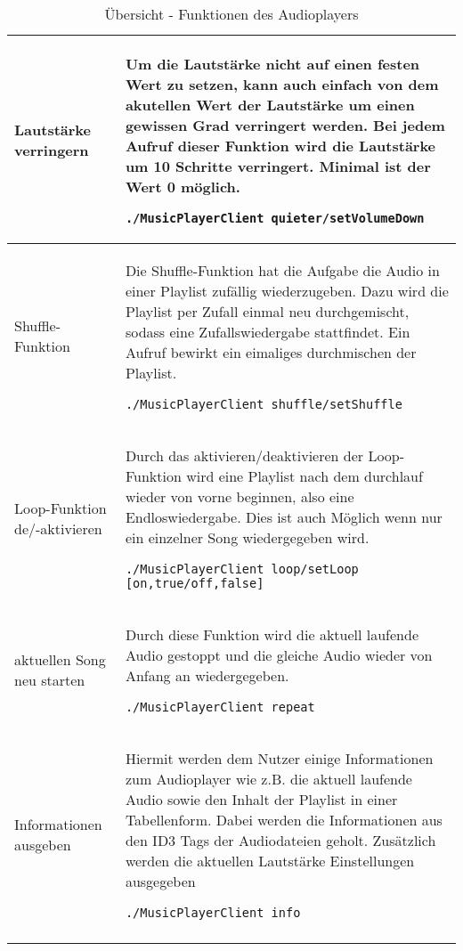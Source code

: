 \begin{longtable}{l|l}
Lautstärke verringern & \begin{minipage}[t]{.558\textwidth} Um die Lautstärke nicht auf einen festen Wert zu setzen, kann auch einfach von dem akutellen Wert der Lautstärke um einen gewissen Grad verringert werden. Bei jedem Aufruf dieser Funktion wird die Lautstärke um 10 Schritte verringert. Minimal ist der Wert 0 möglich. \begin{lstlisting}
./MusicPlayerClient quieter/setVolumeDown
\end{lstlisting} \end{minipage} \\ \hline

Shuffle-Funktion & \begin{minipage}[t]{.558\textwidth} Die Shuffle-Funktion hat die Aufgabe die Audio in einer Playlist zufällig wiederzugeben. Dazu wird die Playlist per Zufall einmal neu durchgemischt, sodass eine Zufallswiedergabe stattfindet. Ein Aufruf bewirkt ein eimaliges durchmischen der Playlist. \begin{lstlisting}
./MusicPlayerClient shuffle/setShuffle
\end{lstlisting} \end{minipage} \\ \hline

Loop-Funktion de/-aktivieren & \begin{minipage}[t]{.558\textwidth} Durch das aktivieren/deaktivieren der Loop-Funktion wird eine Playlist nach dem durchlauf wieder von vorne beginnen, also eine Endloswiedergabe. Dies ist auch Möglich wenn nur ein einzelner Song wiedergegeben wird. \begin{lstlisting}
./MusicPlayerClient loop/setLoop [on,true/off,false]
\end{lstlisting} \end{minipage} \\ \hline

aktuellen Song neu starten & \begin{minipage}[t]{.558\textwidth} Durch diese Funktion wird die aktuell laufende Audio gestoppt und die gleiche Audio wieder von Anfang an wiedergegeben. \begin{lstlisting}
./MusicPlayerClient repeat
\end{lstlisting} \end{minipage} \\ \hline

Informationen ausgeben & \begin{minipage}[t]{.558\textwidth} Hiermit werden dem Nutzer einige Informationen zum Audioplayer wie z.B. die aktuell laufende Audio sowie den Inhalt der Playlist in einer Tabellenform. Dabei werden die Informationen aus den ID3 Tags der Audiodateien geholt. Zusätzlich werden die aktuellen Lautstärke Einstellungen ausgegeben \begin{lstlisting}
./MusicPlayerClient info
\end{lstlisting} \end{minipage} \\
\caption{Übersicht - Funktionen des Audioplayers} %
\label{tab:funktionendesaudioplayer_longtable}
\end{longtable}

